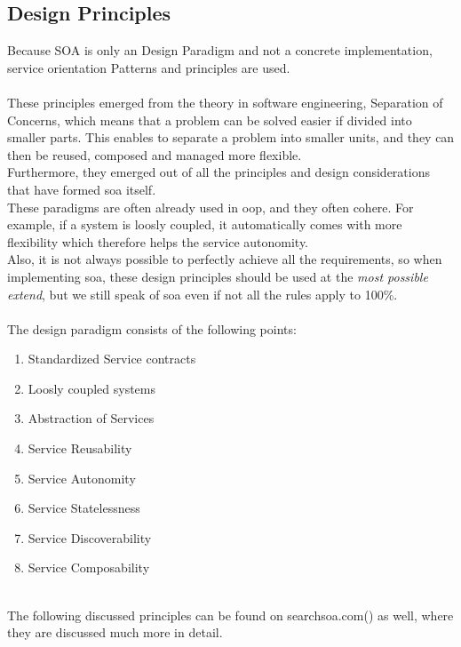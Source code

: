 \documentclass[12pt]{article}
\begin{document}
\subsection{Design Principles}
\label{sec:dp}
Because SOA is only an Design Paradigm and not a concrete implementation, service orientation Patterns and principles are used.\\\\
These principles emerged from the theory in software engineering, Separation of Concerns, which means that a problem can be solved easier if divided into smaller parts. This enables to separate a problem into smaller units, and they can then be reused, composed and managed more flexible.  \cite[page 86]{te}\\ Furthermore, they emerged out of all the principles and design considerations that have formed \gls{soa} itself.
\\
These paradigms are often already used in \gls{oop}, and they often cohere. For example, if a system is loosly coupled, it automatically comes with more flexibility which therefore helps the service autonomity. \\
Also, it is not always possible to perfectly achieve all the requirements, so when implementing \gls{soa}, these design principles should be used at the \textit{most possible extend}, but we still speak of \gls{soa} even if not all the rules apply to 100\%. \\ \\
The design paradigm consists of the following points:
\begin{enumerate}
\item Standardized Service contracts
\item Loosly coupled systems
\item Abstraction of Services
\item Service Reusability
\item Service Autonomity
\item Service Statelessness
\item Service Discoverability
\item Service Composability
\end{enumerate}\cite[page 25]{grau}\\
The following discussed principles can be found on searchsoa.com(\cite{photos}) as well, where they are discussed much more in detail.\newpage
\end{document}
